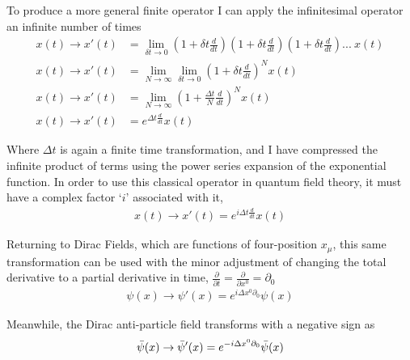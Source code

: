     To produce a more general finite operator I can apply the infinitesimal operator an infinite number of times
    \begin{equation} \begin{split}
    x(t) \to x'(t) &= \lim_{\delta t \to 0} \left(1+\delta t \frac{d}{dt}\right)\left(1+\delta t \frac{d}{dt}\right)\left(1+\delta t \frac{d}{dt}\right)...\ x(t)
    \\x(t) \to x'(t) &= \lim_{N \to \infty} \lim_{\delta t \to 0} \left(1+\delta t \frac{d}{dt}\right)^N x(t)
    \\x(t) \to x'(t) &= \lim_{N \to \infty} \left(1+\frac{\Delta t}{N} \frac{d}{dt}\right)^N x(t)
    \\x(t) \to x'(t) &= e^{\Delta t \frac{d}{dt}} x(t)
    \end{split} \end{equation}

    Where $\Delta t$ is again a finite time transformation,
        and I have compressed the infinite product of terms using the power series expansion of the exponential function.
    In order to use this classical operator in quantum field theory, it must have a complex factor `$i$' associated with it,
    \begin{equation} \begin{split}
    x(t) \to x'(t) = e^{i\Delta t \frac{d}{dt}} x(t)
    \end{split} \end{equation}

    Returning to Dirac Fields, which are functions of four-position $x_\mu$, this same transformation can be used
         with the minor adjustment of changing the total derivative to a partial derivative in time,
         $\frac{\partial}{\partial t} = \frac{\partial}{\partial x^0} = \partial_0$
    \begin{equation} \begin{split}
    \psi(x) \to \psi'(x) = e^{i\Delta x^0 \partial_0} \psi(x)
    \end{split} \end{equation}

    Meanwhile, the Dirac anti-particle field transforms with a negative sign as
    \begin{equation} \begin{split}
        \bar{\psi}(x) \to \bar{\psi}'(x) = e^{-i\Delta x^0 \partial_0} \bar{\psi}(x)
    \end{split} \end{equation}
    
